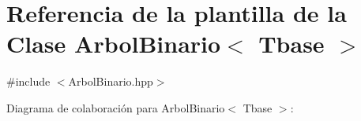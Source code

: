 \hypertarget{classArbolBinario}{}\section{Referencia de la plantilla de la Clase Arbol\+Binario$<$ Tbase $>$}
\label{classArbolBinario}


{\ttfamily \#include $<$Arbol\+Binario.\+hpp$>$}



Diagrama de colaboración para Arbol\+Binario$<$ Tbase $>$\+:
